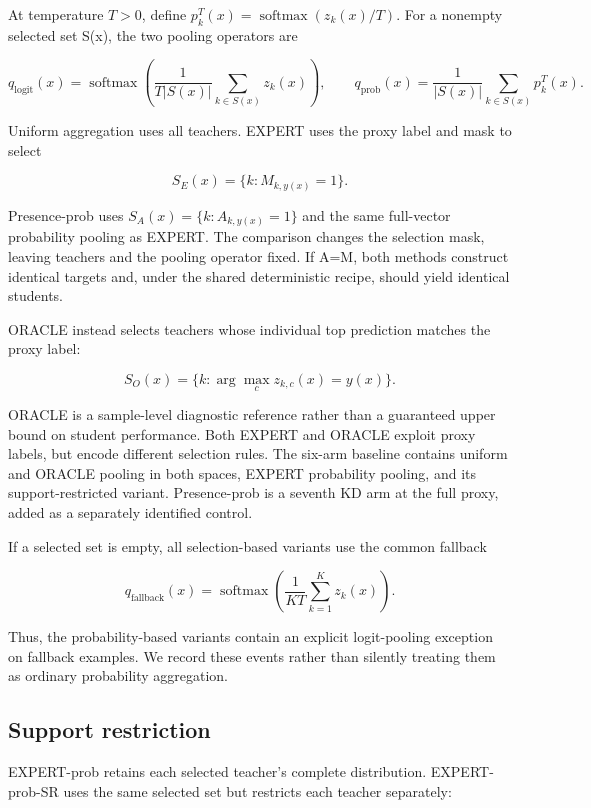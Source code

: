 At temperature \(T>0\), define \(p_k^T(x)=\operatorname{softmax}(z_k(x)/T)\). For a nonempty selected set S(x), the two pooling operators are

\[
q_{\mathrm{logit}}(x)=\operatorname{softmax}\left(\frac{1}{T|S(x)|}\sum_{k\in S(x)}z_k(x)\right),
\qquad
q_{\mathrm{prob}}(x)=\frac{1}{|S(x)|}\sum_{k\in S(x)}p_k^T(x).
\]

Uniform aggregation uses all teachers. EXPERT uses the proxy label and mask to select

\[S_E(x)=\{k:M_{k,y(x)}=1\}.\]

Presence-prob uses \(S_A(x)=\{k:A_{k,y(x)}=1\}\) and the same full-vector probability pooling as EXPERT. The comparison changes the selection mask, leaving teachers and the pooling operator fixed. If A=M, both methods construct identical targets and, under the shared deterministic recipe, should yield identical students.

ORACLE instead selects teachers whose individual top prediction matches the proxy label:

\[S_O(x)=\{k:\arg\max_c z_{k,c}(x)=y(x)\}.\]

ORACLE is a sample-level diagnostic reference rather than a guaranteed upper bound on student performance. Both EXPERT and ORACLE exploit proxy labels, but encode different selection rules. The six-arm baseline contains uniform and ORACLE pooling in both spaces, EXPERT probability pooling, and its support-restricted variant. Presence-prob is a seventh KD arm at the full proxy, added as a separately identified control.

If a selected set is empty, all selection-based variants use the common fallback

\[q_{\mathrm{fallback}}(x)=\operatorname{softmax}\left(\frac{1}{KT}\sum_{k=1}^{K}z_k(x)\right).\]

Thus, the probability-based variants contain an explicit logit-pooling exception on fallback examples. We record these events rather than silently treating them as ordinary probability aggregation.

\hypertarget{support-restriction}{%
\subsection{Support restriction}\label{support-restriction}}

EXPERT-prob retains each selected teacher's complete distribution. EXPERT-prob-SR uses the same selected set but restricts each teacher separately:

